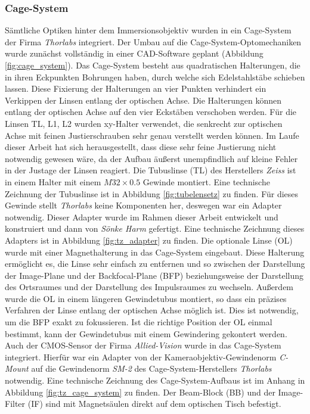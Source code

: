 \documentclass[a4paper, titlepage,  ngerman]{book}
\begin{document}
	\subsubsection{Cage-System}
	Sämtliche Optiken hinter dem Immersionsobjektiv wurden in ein Cage-System der Firma \textit{Thorlabs} integriert. Der Umbau auf die Cage-System-Optomechaniken wurde zunächst vollständig in einer CAD-Software geplant (Abbildung \ref{fig:cage_system}). Das Cage-System besteht aus quadratischen Halterungen, die in ihren Eckpunkten Bohrungen haben, durch welche sich Edelstahlstäbe schieben lassen. Diese Fixierung der Halterungen an vier Punkten verhindert ein Verkippen der Linsen entlang der optischen Achse. Die Halterungen können entlang der optischen Achse auf den vier Eckstäben verschoben werden. Für die  Linsen TL, L1, L2 wurden xy-Halter verwendet, die senkrecht zur optischen Achse mit feinen Jus\-tierschrauben sehr genau verstellt werden können. Im Laufe dieser Arbeit hat sich herausgestellt, dass diese sehr feine Justierung nicht notwendig gewesen wäre, da der Aufbau äußerst unempfindlich auf kleine Fehler in der Justage der Linsen reagiert. Die Tubuslinse (TL) des Herstellers \textit{Zeiss} ist in einem Halter mit einem $M32\times0.5$ Gewinde montiert. Eine technische Zeichnung der Tubuslinse ist in Abbildung \ref{fig:tubelensetz} zu finden. Für dieses Gewinde stellt \textit{Thorlabs} keine Komponenten her, deswegen war ein Adapter notwendig. Dieser Adapter wurde im Rahmen dieser Arbeit entwickelt und konstruiert und dann von \textit{Sönke Harm} gefertigt. Eine technische Zeichnung dieses Adapters ist in Abbildung \ref{fig:tz_adapter} zu finden. Die optionale Linse (OL) wurde mit einer Magnethalterung in das Cage-System eingebaut. Diese Halterung ermöglicht es, die Linse sehr einfach zu entfernen und so zwischen der Darstellung der Image-Plane und der Backfocal-Plane (BFP) beziehungsweise der Darstellung des Ortsraumes und der Darstellung des Impulsraumes zu wechseln. Außerdem wurde die OL in einem längeren Gewindetubus montiert, so dass ein präzises Verfahren der Linse entlang der optischen Achse möglich ist. Dies ist notwendig, um die BFP exakt zu fokussieren. Ist die richtige Position der OL einmal bestimmt, kann der Gewindetubus mit einem Gewindering gekontert werden. Auch der CMOS-Sensor der Firma \textit{Allied-Vision} wurde in das Cage-System integriert. Hierfür war ein Adapter von der Kameraobjektiv-Gewindenorm \textit{C-Mount} auf die Gewindenorm \textit{SM-2} des Cage-System-Herstellers \textit{Thorlabs} notwendig. Eine technische Zeichnung des Cage-System-Aufbaus ist im Anhang in Abbildung \ref{fig:tz_cage_system} zu finden. Der Beam-Block (BB) und der Image-Filter (IF) sind mit Magnetsäulen direkt auf dem optischen Tisch befestigt.
\end{document}
